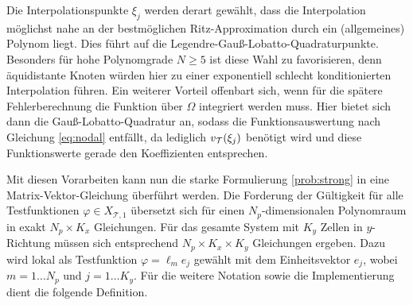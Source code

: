 Die Interpolationspunkte $\xi_j$ werden derart gewählt, dass die Interpolation möglichst nahe an der bestmöglichen Ritz-Approximation durch ein (allgemeines) Polynom liegt. Dies führt auf die Legendre-Gauß-Lobatto-Quadraturpunkte. Besonders für hohe Polynomgrade $N\geq 5$ ist diese Wahl zu favorisieren, denn äquidistante Knoten würden hier zu einer exponentiell schlecht konditionierten Interpolation führen. Ein weiterer Vorteil offenbart sich, wenn für die spätere Fehlerberechnung die Funktion über $\Omega$ integriert werden muss. Hier bietet sich dann die Gauß-Lobatto-Quadratur an, sodass die Funktionsauswertung nach Gleichung \eqref{eq:nodal} entfällt, da lediglich $v_{\mathcal{T}}(\xi_j)$ benötigt wird und diese Funktionswerte gerade den Koeffizienten entsprechen.

Mit diesen Vorarbeiten kann nun die starke Formulierung \ref{prob:strong} in eine Matrix-Vektor-Gleichung überführt werden. Die Forderung der Gültigkeit für alle Testfunktionen $\varphi\in X_{\mathcal{T},1}$ übersetzt sich für einen $N_p$-dimensionalen Polynomraum in exakt $N_p \times K_x$ Gleichungen. Für das gesamte System mit $K_y$ Zellen in $y$-Richtung müssen sich entsprechend $N_p \times K_x \times K_y$ Gleichungen ergeben. Dazu wird lokal als Testfunktion $\varphi = \ell_m e_j$ gewählt mit dem Einheitsvektor $e_j$, wobei $m=1\dots N_p$ und $j=1\dots K_y$. Für die weitere Notation sowie die Implementierung dient die folgende Definition.
